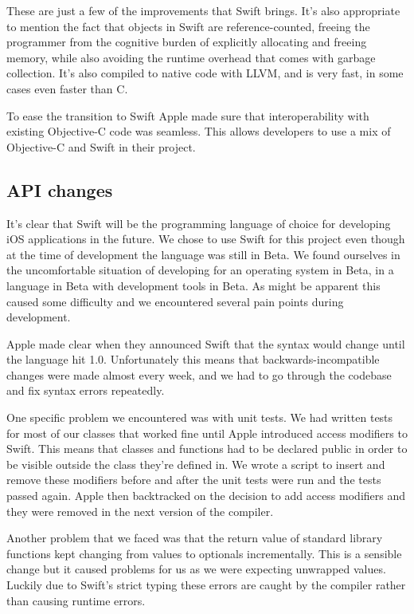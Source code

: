 \documentclass[pdftex, DIV=calc, paper=a4, fontsize=11pt, twocolumn]{scrartcl}	 %
\begin{document}
These are just a few of the improvements that Swift brings. It's also appropriate to mention the fact
that objects in Swift are reference-counted, freeing the programmer from the cognitive burden of
explicitly allocating and freeing memory, while also avoiding the runtime overhead that comes with
garbage collection. It's also compiled to native code with LLVM, and is very fast, in some cases even
faster than C.

To ease the transition to Swift Apple made sure that interoperability with existing Objective-C 
code was seamless. This allows developers to use a mix of Objective-C and Swift in their project.

\subsection*{API changes}

It's clear that Swift will be the programming language of choice for developing iOS applications
in the future. We chose to use Swift for this project even though at the time of development the
language was still in Beta. We found ourselves in the uncomfortable situation of developing for an
operating system in Beta, in a language in Beta with development tools in Beta. As might be apparent
this caused some difficulty and we encountered several pain points during development.

Apple made clear when they announced Swift that the syntax would change until the language hit 1.0.
Unfortunately this means that backwards-incompatible changes were made almost every week, and we had
to go through the codebase and fix syntax errors repeatedly.

One specific problem we encountered was with unit tests. We had written tests for most of our classes
that worked fine until Apple introduced access modifiers to Swift. This means that classes and 
functions had to be declared public in order to be visible outside the class they're defined in. We
wrote a script to insert and remove these modifiers before and after the unit tests were run and
the tests passed again. Apple then backtracked on the decision to add access modifiers and they were
removed in the next version of the compiler. 

Another problem that we faced was that the return value of standard library functions kept changing
from values to optionals incrementally. This is a sensible change but it caused problems for us as
we were expecting unwrapped values. Luckily due to Swift's strict typing these errors are caught by
the compiler rather than causing runtime errors.
\end{document}
